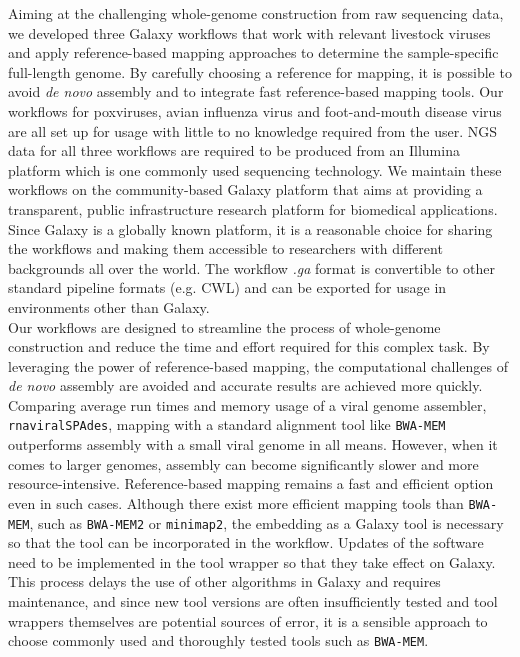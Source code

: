 Aiming at the challenging whole-genome construction from raw sequencing data, we developed three Galaxy workflows that work with relevant livestock viruses and apply reference-based mapping approaches to determine the sample-specific full-length genome. By carefully choosing a reference for mapping, it is possible to avoid \textit{de novo} assembly and to integrate fast reference-based mapping tools. Our workflows for poxviruses, avian influenza virus and foot-and-mouth disease virus are all set up for usage with little to no knowledge required from the user. \ac{NGS} data for all three workflows are required to be produced from an Illumina platform which is one commonly used sequencing technology. We maintain these workflows on the community-based Galaxy platform that aims at providing a transparent, public infrastructure research platform for biomedical applications. Since Galaxy is a globally known platform, it is a reasonable choice for sharing the workflows and making them accessible to researchers with different backgrounds all over the world. The workflow \textit{.ga} format is convertible to other standard pipeline formats (e.g. \ac{CWL}) and can be exported for usage in environments other than Galaxy.\\
Our workflows are designed to streamline the process of whole-genome construction and reduce the time and effort required for this complex task. By leveraging the power of reference-based mapping, the computational challenges of \textit{de novo} assembly are avoided and accurate results are achieved more quickly. Comparing average run times and memory usage of a viral genome assembler, \texttt{rnaviralSPAdes}, mapping with a standard alignment tool like \texttt{BWA-MEM} outperforms assembly with a small viral genome in all means. However, when it comes to larger genomes, assembly can become significantly slower and more resource-intensive. Reference-based mapping remains a fast and efficient option even in such cases. Although there exist more efficient mapping tools than \texttt{BWA-MEM}, such as \texttt{BWA-MEM2} or \texttt{minimap2}, the embedding as a Galaxy tool is necessary so that the tool can be incorporated in the workflow. Updates of the software need to be implemented in the tool wrapper so that they take effect on Galaxy. This process delays the use of other algorithms in Galaxy and requires maintenance, and since new tool versions are often insufficiently tested and tool wrappers themselves are potential sources of error, it is a sensible approach to choose commonly used and thoroughly tested tools such as \texttt{BWA-MEM}.\\
